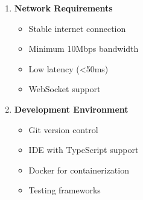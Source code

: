 \begin{enumerate}
    \item \textbf{Network Requirements}
    \begin{itemize}
        \item Stable internet connection
        \item Minimum 10Mbps bandwidth
        \item Low latency (<50ms)
        \item WebSocket support
    \end{itemize}

    \item \textbf{Development Environment}
    \begin{itemize}
        \item Git version control
        \item IDE with TypeScript support
        \item Docker for containerization
        \item Testing frameworks
    \end{itemize}
\end{enumerate} 